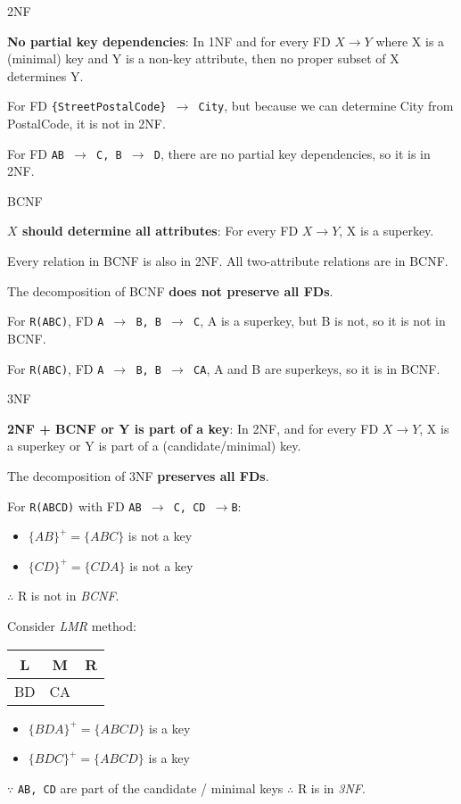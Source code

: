 \begin{definition}
    {2NF}

    \textbf{No partial key dependencies}: In 1NF and for every FD $X \to Y$ where X is a (minimal) key and Y is a non-key attribute, then no proper subset of X determines Y.

    \tcblower

    For FD \texttt{\{StreetPostalCode\} $\rightarrow$ City}, but because we can determine City from PostalCode, it is not in 2NF.

    For FD \texttt{AB $\rightarrow$ C, B $\rightarrow$ D}, there are no partial key dependencies, so it is in 2NF.
\end{definition}

\begin{definition}
    {BCNF}

    \textbf{$X$ should determine all attributes}: For every FD $X \to Y$, X is a superkey.

    Every relation in BCNF is also in 2NF. All two-attribute relations are in BCNF.

    The decomposition of BCNF \textbf{does not preserve all FDs}.

    \tcblower

    For \texttt{R(ABC)}, FD \texttt{A $\rightarrow$ B, B $\rightarrow$ C}, A is a superkey, but B is not, so it is not in BCNF.

    For \texttt{R(ABC)}, FD \texttt{A $\rightarrow$ B, B $\rightarrow$ CA}, A and B are superkeys, so it is in BCNF.
\end{definition}

\begin{definition}
    {3NF}

    \textbf{2NF + BCNF or Y is part of a key}: In 2NF, and for every FD $X \to Y$, X is a superkey or Y is part of a (candidate/minimal) key.

    The decomposition of 3NF \textbf{preserves all FDs}.

    \tcblower

    For \texttt{R(ABCD)} with FD \texttt{AB $\rightarrow$ C, CD $\rightarrow$B}:
    \begin{itemize}
        \item $\{AB\}^+=\{ABC\}$ is not a key
        \item $\{CD\}^+=\{CDA\}$ is not a key
    \end{itemize}
    $\therefore$ R is not in \textit{BCNF}.

    Consider \textit{LMR} method:
    \begin{tabular}{c|c|c}
        L  & M  & R \\
        \hline
        BD & CA &   \\
    \end{tabular}
    \begin{itemize}
        \item $\{BDA\}^+=\{ABCD\}$ is a key
        \item $\{BDC\}^+=\{ABCD\}$ is a key
    \end{itemize}
    $\because$ \texttt{AB, CD} are part of the candidate / minimal keys
    $\therefore$ R is in \textit{3NF}.
\end{definition}

